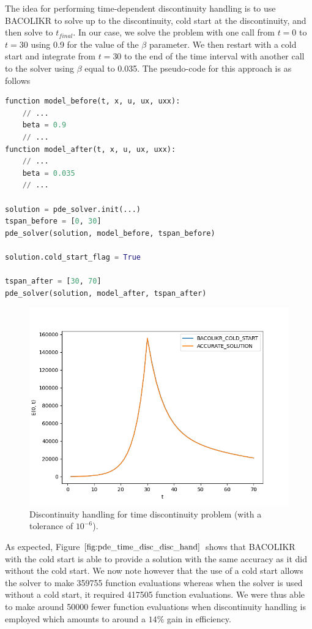 The idea for performing time-dependent discontinuity handling is to use BACOLIKR to solve up to the discontinuity, cold start at the discontinuity, and then solve to $t_{final}$. In our case, we solve the problem with one call from $t=0$ to $t=30$ using 0.9 for the value of the $\beta$ parameter. We then restart with a cold start and integrate from $t=30$ to the end of the time interval with another call to the solver using $\beta$ equal to 0.035. The pseudo-code for this approach is as follows

\begin{minipage}{\linewidth}
\begin{lstlisting}[language=Python]
function model_before(t, x, u, ux, uxx):
	// ...
	beta = 0.9
	// ...
function model_after(t, x, u, ux, uxx):
	// ...
	beta = 0.035
	// ...

solution = pde_solver.init(...)
tspan_before = [0, 30]
pde_solver(solution, model_before, tspan_before)

solution.cold_start_flag = True

tspan_after = [30, 70]
pde_solver(solution, model_after, tspan_after)

\end{lstlisting}
\end{minipage}

\begin{figure}[H]
\centering
\includegraphics[width=0.7\linewidth]{./figures/pde_time_disc_disc_hand}
\caption{Discontinuity handling for time discontinuity problem (with a tolerance of $10^{-6}$).}
\label{fig:pde_time_disc_disc_hand}
\end{figure}

As expected, Figure $\ref{fig:pde_time_disc_disc_hand}$ shows that BACOLIKR with the cold start is able to provide a solution with the same accuracy as it did without the cold start. We now note however that the use of a cold start allows the solver to make 359755 function evaluations whereas when the solver is used without a cold start, it required 417505 function evaluations. We were thus able to make around 50000 fewer function evaluations when discontinuity handling is employed which amounts to around a $14\%$ gain in efficiency.

